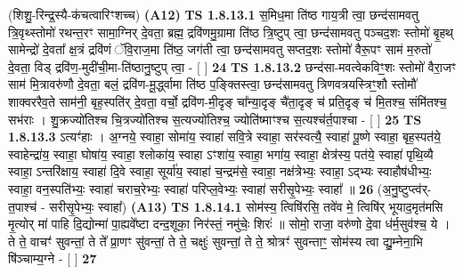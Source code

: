 \documentclass[17pt]{extarticle}
\begin{document}
                  \newline
                      (शिशु॒-रिन्द्र॒स्यै-क॑चत्वारिꣳशच्च)  \textbf{(A12)} \newline \newline
                                        \textbf{ TS 1.8.13.1} \newline
                  स॒मिध॒मा ति॑ष्ठ गाय॒त्री त्वा॒ छन्द॑सामवतु त्रि॒वृथ्स्तोमो॑ रथन्त॒रꣳ सामा॒ग्निर् दे॒वता॒ ब्रह्म॒ द्रवि॑णमु॒ग्रामा ति॑ष्ठ त्रि॒ष्टुप् त्वा॒ छन्द॑सामवतु पञ्चद॒शः स्तोमो॑ बृ॒हथ् सामेन्द्रो॑ दे॒वता᳚ क्ष॒त्रं द्रवि॑णं ॅवि॒राज॒मा ति॑ष्ठ॒ जग॑ती त्वा॒ छन्द॑सामवतु सप्तद॒शः स्तोमो॑ वैरू॒पꣳ साम॑ म॒रुतो॑ दे॒वता॒ विड् द्रवि॑ण॒-मुदी॑ची॒मा-ति॑ष्ठानु॒ष्टुप् त्वा॒ - [ ] \textbf{  24} \newline
                  \newline
                                \textbf{ TS 1.8.13.2} \newline
                  छन्द॑सा-मवत्वेकविꣳ॒॒शः स्तोमो॑ वैरा॒जꣳ साम॑ मि॒त्रावरु॑णौ दे॒वता॒ बलं॒ द्रवि॑ण-मू॒र्द्ध्वामा ति॑ष्ठ प॒ङ्क्तिस्त्वा॒ छन्द॑सामवतु त्रिणवत्रयस्त्रिꣳ॒॒शौ स्तोमौ॑ शाक्वररैव॒ते साम॑नी॒ बृह॒स्पति॑र् दे॒वता॒ वर्चो॒ द्रवि॑ण-मी॒दृङ् चा᳚न्या॒दृङ् चै॑ता॒दृङ् च॑ प्रति॒दृङ् च॑ मि॒तश्च॒ संमि॑तश्च॒ सभ॑राः । शु॒क्रज्यो॑तिश्च चि॒त्रज्यो॑तिश्च स॒त्यज्यो॑तिश्च॒ ज्योति॑ष्माꣳश्च स॒त्यश्च॑र्त॒पाश्चा - [ ] \textbf{  25} \newline
                  \newline
                                \textbf{ TS 1.8.13.3} \newline
                  ऽत्यꣳ॑हाः । अ॒ग्नये॒ स्वाहा॒ सोमा॑य॒ स्वाहा॑ सवि॒त्रे स्वाहा॒ सर॑स्वत्यै॒ स्वाहा॑ पू॒ष्णे स्वाहा॒ बृह॒स्पत॑ये॒ स्वाहेन्द्रा॑य॒ स्वाहा॒ घोषा॑य॒ स्वाहा॒ श्लोका॑य॒ स्वाहा ऽꣳशा॑य॒ स्वाहा॒ भगा॑य॒ स्वाहा॒ क्षेत्र॑स्य॒ पत॑ये॒ स्वाहा॑ पृथि॒व्यै स्वाहा॒ ऽन्तरि॑क्षाय॒ स्वाहा॑ दि॒वे स्वाहा॒ सूर्या॑य॒ स्वाहा॑ च॒न्द्रम॑से॒ स्वाहा॒ नक्ष॑त्रेभ्यः॒ स्वाहा॒ ऽद्भ्यः स्वाहौष॑धीभ्यः॒ स्वाहा॒ वन॒स्पति॑भ्यः॒ स्वाहा॑ चराच॒रेभ्यः॒ स्वाहा॑ परिप्ल॒वेभ्यः॒ स्वाहा॑ सरीसृ॒पेभ्यः॒ स्वाहा᳚ ॥ \textbf{  26} \newline
                  \newline
                      (अ॒नु॒ष्टुप्त्व॑र्-त॒पाश्च॑ - सरीसृ॒पेभ्यः॒ स्वाहा᳚)  \textbf{(A13)} \newline \newline
                                        \textbf{ TS 1.8.14.1} \newline
                  सोम॑स्य॒ त्विषि॑रसि॒ तवे॑व मे॒ त्विषि॑र् भूयाद॒मृत॑मसि मृ॒त्योर् मा॑ पाहि दि॒द्योन्मा॑ पा॒ह्यवे᳚ष्टा दन्द॒शूका॒ निर॑स्तं॒ नमु॑चेः॒ शिरः॑ ॥ सोमो॒ राजा॒ वरु॑णो दे॒वा ध॑र्म॒सुव॑श्च॒ ये । ते ते॒ वाचꣳ॑ सुवन्तां॒ ते ते᳚ प्रा॒णꣳ सु॑वन्तां॒ ते ते॒ चक्षुः॑ सुवन्तां॒ ते ते॒ श्रोत्रꣳ॑ सुवन्ताꣳ॒॒ सोम॑स्य त्वा द्यु॒म्नेना॒भि षि॑ञ्चाम्य॒ग्ने - [ ] \textbf{  27} \newline
\end{document}
